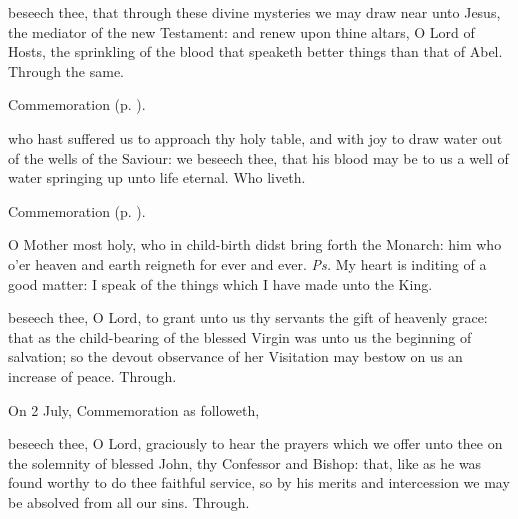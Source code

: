 \secret
{} beseech thee, that through these divine mysteries we may draw near unto Jesus, the mediator of the new Testament: and renew upon thine altars, O Lord of Hosts, the sprinkling of the blood that speaketh better things than that of Abel. Through the same.

\begin{rubric}
    Commemoration  (p. \pageref{JohnSecret}).
\end{rubric}


\postcommunion
{} who hast suffered us to approach thy holy table, and with joy to draw water out of the wells of the Saviour: we beseech thee, that his blood may be to us a well of water springing up unto life eternal. Who liveth.
\begin{rubric}
    Commemoration  (p. \pageref{JohnPC}).
\end{rubric}



\introit
{} O Mother most holy, who in child-birth didst bring forth the Monarch: him who o'er heaven and earth reigneth for ever and ever. \textit{Ps.} My heart is inditing of a good matter: I speak of the things which I have made unto the King.

\collect
{} beseech thee, O Lord, to grant unto us thy servants the gift of heavenly grace: that as the child-bearing of the blessed Virgin was unto us the beginning of salvation; so the devout observance of her Visitation may bestow on us an increase of peace. Through.

\begin{rubric}
	 On 2 July, Commemoration  as followeth,
\end{rubric}
 beseech thee, O Lord, graciously to hear the prayers which we offer unto thee on the solemnity of blessed John, thy Confessor and Bishop: that, like as he was found worthy to do thee faithful service, so by his merits and intercession we may be absolved from all our sins. Through.

